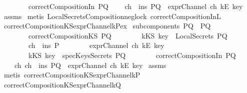 \begin{isabellebody}
\ \ \ \ \ \ \ \ {\isachardoublequoteopen}correctCompositionIn\ PQ{\isachardoublequoteclose}\isanewline
{}\ \ \ \ {\isachardoublequoteopen}ch\ {\isasymin}\ ins\ PQ\ {\isasymand}\ exprChannel\ ch\ {\isacharparenleft}kE\ key{\isacharparenright}{\isachardoublequoteclose}\isanewline
%
\isadelimproof
%
\endisadelimproof
%
\isatagproof
{}\isamarkupfalse%
\ assms\isanewline
{}\isamarkupfalse%
\ {\isacharparenleft}metis\ LocalSecretsComposition{\isacharunderscore}neg{\isacharunderscore}loc{\isacharunderscore}k\ correctCompositionIn{\isacharunderscore}L{}{\isacharparenright}%
\endisatagproof
{\isafoldproof}%
%
\isadelimproof
\isanewline
%
\endisadelimproof
\isanewline
{}\isamarkupfalse%
\ correctCompositionKS{\isacharunderscore}exprChannel{\isacharunderscore}k{\isacharunderscore}Pex{\isacharcolon}\isanewline
{}\ {\isachardoublequoteopen}subcomponents\ PQ\ {\isacharequal}\ {\isacharbraceleft}P{\isacharcomma}Q{\isacharbraceright}{\isachardoublequoteclose}\ \isanewline
\ \ \ \ \ \ \ \ {\isachardoublequoteopen}correctCompositionKS\ PQ{\isachardoublequoteclose}\isanewline
\ \ \ \ \ \ \ \ {\isachardoublequoteopen}kKS\ key\ {\isasymnotin}\ LocalSecrets\ PQ{\isachardoublequoteclose}\isanewline
\ \ \ \ \ \ \ \ {\isachardoublequoteopen}ch\ {\isasymin}\ ins\ P{\isachardoublequoteclose}\isanewline
\ \ \ \ \ \ \ \ {\isachardoublequoteopen}exprChannel\ ch\ {\isacharparenleft}kE\ key{\isacharparenright}{\isachardoublequoteclose}\isanewline
\ \ \ \ \ \ \ \ {\isachardoublequoteopen}kKS\ key\ {\isasymnotin}\ specKeysSecrets\ PQ{\isachardoublequoteclose}\isanewline
\ \ \ \ \ \ \ \ {\isachardoublequoteopen}correctCompositionIn\ PQ{\isachardoublequoteclose}\isanewline
{}\ \ \ \ {\isachardoublequoteopen}{\isasymexists}ch{\isachardot}\ ch\ {\isasymin}\ ins\ PQ\ {\isasymand}\ exprChannel\ ch\ {\isacharparenleft}kE\ key{\isacharparenright}{\isachardoublequoteclose}\isanewline
%
\isadelimproof
%
\endisadelimproof
%
\isatagproof
{}\isamarkupfalse%
\ assms\isanewline
{}\isamarkupfalse%
\ {\isacharparenleft}metis\ correctCompositionKS{\isacharunderscore}exprChannel{\isacharunderscore}k{\isacharunderscore}P{\isacharparenright}%
\endisatagproof
{\isafoldproof}%
%
\isadelimproof
\isanewline
%
\endisadelimproof
\isanewline
{}\isamarkupfalse%
\ correctCompositionKS{\isacharunderscore}exprChannel{\isacharunderscore}k{\isacharunderscore}Q{\isacharcolon}\isanewline

\end{isabellebody}
